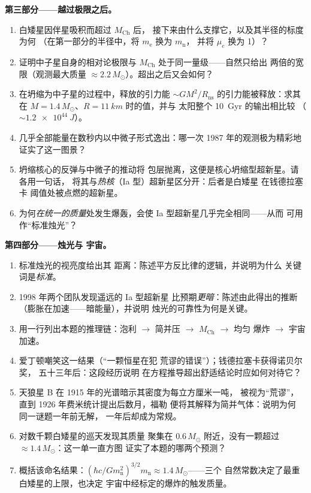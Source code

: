 \begin{problem}
\medskip\noindent\textbf{第三部分——越过极限之后。}
\begin{enumerate}[resume]
  \item 白矮星因伴星吸积而超过 $M_{\text{Ch}}$ 后，
        接下来由什么支撑它，以及其半径的标度为何
        （在第一部分的半径中，将 $m_{\text{e}}$ 换为 $m_{\text{n}}$，
        并将 $\mu_e$ 换为 1）？
  \item 证明中子星自身的相对论极限与
        $M_{\text{Ch}}$ 处于同一量级——自然只给出
        两倍的宽限（观测最大质量 $\approx
        2.2\,M_\odot$）。超出之后又会如何？
  \item 在坍缩为中子星的过程中，释放的引力能 $\sim GM^2/R_{
        \text{ns}}$ 的引力能被释放：求其在
        $M = 1.4\,M_\odot$、$R = \qty{11}{km}$ 时的值，并与
        太阳整个 \qty{10}{Gyr} 的输出相比较
        （$\sim\qty{1.2e44}{J}$）。
  \item 几乎全部能量在数秒内以中微子形式逸出：哪一次
        1987 年的观测极为精彩地证实了这一图景？
  \item 坍缩核心的反弹与中微子的推动将
        包层抛离，这便是核心坍缩型超新星。请各用一句话，
        将其与\emph{热核}（Ia 型）超新星区分开：后者是白矮星
        在钱德拉塞卡
        阈值处被点燃的超新星。
  \item 为何\emph{在统一的质量}处发生爆轰，会使
        Ia 型超新星几乎完全相同——从而
        可用作“标准烛光”？
\end{enumerate}

\medskip\noindent\textbf{第四部分——烛光与
宇宙。}
\begin{enumerate}[resume]
  \item 标准烛光的视亮度给出其
        距离：陈述平方反比律的逻辑，并说明为什么
        关键词是\emph{标准}。
  \item 1998 年两个团队发现遥远的 Ia 型超新星
        比预期\emph{更暗}：陈述由此得出的推断
        （膨胀在加速——暗能量），并说明
        烛光的可靠性为何是关键。
  \item 用一行列出本题的推理链：泡利 $\to$
        简并压 $\to$ $M_{\text{Ch}}$ $\to$ 均匀
        爆炸 $\to$ 宇宙加速。
  \item 爱丁顿嘲笑这一结果（“一颗恒星在犯
        荒谬的错误”）；钱德拉塞卡获得诺贝尔奖，
        五十三年后：这段经历说明
        在方程推导超出舒适结论时应如何对待它？
  \item 天狼星 B 在 1915 年的光谱暗示其密度为每立方厘米一吨，
        被视为“荒谬”，直到 1926 年费米统计提出后数月，福勒
        便将其解释为简并气体：说明为何
        同一谜题一年前无解，
        一年后却成为常规。
  \item 对数千颗白矮星的巡天发现其质量
        聚集在 $0.6\,M_\odot$ 附近，没有一颗超过
        $\approx1.4\,M_\odot$：这一单一直方图
        证实了本题的哪两个预测？
  \item 概括该命名结果：$(\hbar c/Gm_{\text{n}}^2)^{
        3/2}m_{\text{n}} \approx 1.4\,M_\odot$——三个
        自然常数决定了最重白矮星的上限，也决定
        宇宙中经标定的爆炸的触发质量。
\end{enumerate}
\end{problem}
